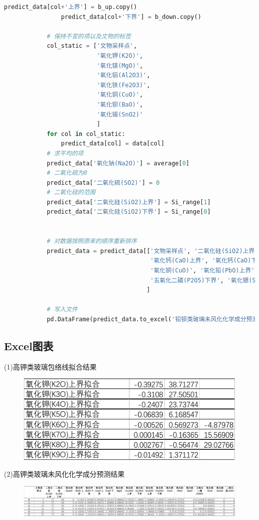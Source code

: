 \documentclass[withoutpreface,bwprint]{cumcmthesis}
\begin{document}
\begin{appendices}
\begin{lstlisting}[language=Python]
				predict_data[col+'上界'] = b_up.copy()
				predict_data[col+'下界'] = b_down.copy()
			
			# 保持不变的项以及文物的标签
			col_static = ['文物采样点',
						  '氧化钾(K2O)',
						  '氧化镁(MgO)',
						  '氧化铝(Al2O3)',
						  '氧化铁(Fe2O3)',
						  '氧化铜(CuO)',
						  '氧化钡(BaO)',
						  '氧化锡(SnO2)'
						  ]
			for col in col_static:
				predict_data[col] = data[col]
			# 求平均的项
			predict_data['氧化钠(Na2O)'] = average[0]
			# 二氧化硫为0
			predict_data['二氧化硫(SO2)'] = 0
			# 二氧化硅的范围
			predict_data['二氧化硅(SiO2)上界'] = Si_range[1]
			predict_data['二氧化硅(SiO2)下界'] = Si_range[0]
			
			
			# 对数据按照原来的顺序重新排序
			predict_data = predict_data[['文物采样点', '二氧化硅(SiO2)上界', '二氧化硅(SiO2)下界', '氧化钠(Na2O)', '氧化钾(K2O)',
										 '氧化钙(CaO)上界', '氧化钙(CaO)下界', '氧化镁(MgO)', '氧化铝(Al2O3)', '氧化铁(Fe2O3)',
										 '氧化铜(CuO)', '氧化铅(PbO)上界', '氧化铅(PbO)下界', '氧化钡(BaO)','五氧化二磷(P2O5)上界', 
										 '五氧化二磷(P2O5)下界', '氧化锶(SrO)上界', '氧化锶(SrO)下界', '氧化锡(SnO2)', '二氧化硫(SO2)']
										]
			
			# 写入文件
			pd.DataFrame(predict_data.to_excel('铅钡类玻璃未风化化学成分预测结果.xlsx'))
		\end{lstlisting}

		\subsection{Excel图表}

		(1)高钾类玻璃包络线拟合结果

		\begin{figure}[H]
			\centering
			\includegraphics{高钾包络线拟合}
		\end{figure}
		
		(2)高钾类玻璃未风化化学成分预测结果

		\begin{figure}[H]
			\centering
			\includegraphics[width=\textwidth]{高钾未风化预测}
		\end{figure}


\end{appendices}
\end{document}
